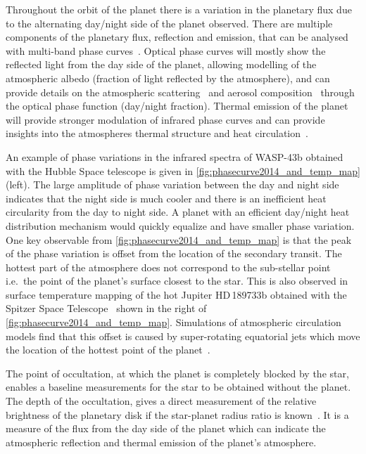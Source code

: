 Throughout the orbit of the planet there is a variation in the planetary flux due to the alternating day/night side of the planet observed.
There are multiple components of the planetary flux, reflection and emission, that can be analysed with multi-band phase curves~\citep[e.g.][]{knutson_characterizing_2009, esteves_optical_2013}.
Optical phase curves will mostly show the reflected light from the day side of the planet, allowing modelling of the atmospheric albedo (fraction of light reflected by the atmosphere), and can provide details on the atmospheric scattering~\citep{madhusudhan_analytic_2012} and aerosol composition~\citep{oreshenko_optical_2016} through the optical phase function (day/night fraction).
Thermal emission of the planet will provide stronger modulation of infrared phase curves and can provide insights into the atmospheres thermal
structure and heat circulation~\citep{goodman_thermodynamics_2009, koll_temperature_2016}.

An example of phase variations in the infrared spectra of {WASP-43b} obtained with the Hubble Space telescope is given in \cref{fig:phasecurve2014_and_temp_map} (left). 
The large amplitude of phase variation between the day and night side indicates that the night side is much cooler and there is an inefficient heat circularity from the day to night side.
A planet with an efficient day/night heat distribution mechanism would quickly equalize and have smaller phase variation.
One key observable from \cref{fig:phasecurve2014_and_temp_map} is that the peak of the phase variation is offset from the location of the secondary transit.
The hottest part of the atmosphere does not correspond to the sub-stellar point i.e.\ the point of the planet's surface closest to the star.
This is also observed in surface temperature mapping of the hot Jupiter HD\,189733b obtained with the {Spitzer Space Telescope}~\citep{knutson_map_2007} shown in the right of \cref{fig:phasecurve2014_and_temp_map}.
Simulations of atmospheric circulation models find that this offset is caused by super-rotating equatorial jets which move the location of the hottest point of the planet~\citep[e.g.][and references therein]{heng_atmospheric_2015}.

The point of occultation, at which the planet is completely blocked by the star, enables a baseline measurements for the star to be obtained without the planet.
The depth of the occultation, gives a direct measurement of the relative brightness of the planetary disk if the star-planet radius ratio is known~\citep{winn_transits_2010}.
It is a measure of the flux from the day side of the planet which can indicate the atmospheric reflection and thermal emission of the planet's atmosphere.

